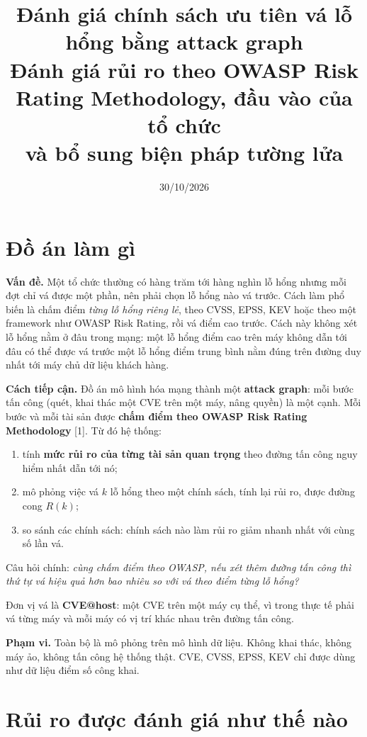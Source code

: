 \documentclass[11pt,a4paper]{article}
\title{\textbf{Đánh giá chính sách ưu tiên vá lỗ hổng bằng attack graph}\\[2pt]
\large Đánh giá rủi ro theo OWASP Risk Rating Methodology, đầu vào của tổ chức\\ và bổ sung biện pháp tường lửa}
\author{}
\date{30/10/2026}
\begin{document}
\maketitle
\vspace{-1.2cm}

\section{Đồ án làm gì}

\textbf{Vấn đề.} Một tổ chức thường có hàng trăm tới hàng nghìn lỗ hổng nhưng mỗi đợt chỉ vá được một phần, nên phải chọn lỗ hổng nào vá trước. Cách làm phổ biến là chấm điểm \emph{từng lỗ hổng riêng lẻ}, theo CVSS, EPSS, KEV hoặc theo một framework như OWASP Risk Rating, rồi vá điểm cao trước. Cách này không xét lỗ hổng nằm ở đâu trong mạng: một lỗ hổng điểm cao trên máy không dẫn tới đâu có thể được vá trước một lỗ hổng điểm trung bình nằm đúng trên đường duy nhất tới máy chủ dữ liệu khách hàng.

\textbf{Cách tiếp cận.} Đồ án mô hình hóa mạng thành một \textbf{attack graph}: mỗi bước tấn công (quét, khai thác một CVE trên một máy, nâng quyền) là một cạnh. Mỗi bước và mỗi tài sản được \textbf{chấm điểm theo OWASP Risk Rating Methodology} [1]. Từ đó hệ thống:
\begin{enumerate}
  \item tính \textbf{mức rủi ro của từng tài sản quan trọng} theo đường tấn công nguy hiểm nhất dẫn tới nó;
  \item mô phỏng việc vá $k$ lỗ hổng theo một chính sách, tính lại rủi ro, được đường cong $R(k)$;
  \item so sánh các chính sách: chính sách nào làm rủi ro giảm nhanh nhất với cùng số lần vá.
\end{enumerate}

Câu hỏi chính: \emph{cùng chấm điểm theo OWASP, nếu xét thêm đường tấn công thì thứ tự vá hiệu quả hơn bao nhiêu so với vá theo điểm từng lỗ hổng?}

Đơn vị vá là \textbf{CVE@host}: một CVE trên một máy cụ thể, vì trong thực tế phải vá từng máy và mỗi máy có vị trí khác nhau trên đường tấn công.

\textbf{Phạm vi.} Toàn bộ là mô phỏng trên mô hình dữ liệu. Không khai thác, không máy ảo, không tấn công hệ thống thật. CVE, CVSS, EPSS, KEV chỉ được dùng như dữ liệu điểm số công khai.

\section{Rủi ro được đánh giá như thế nào}
\end{document}
